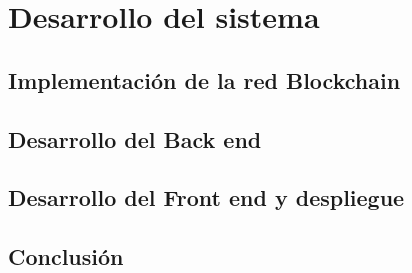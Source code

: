 \section{Desarrollo del sistema}

\subsection{Implementación de la red Blockchain}

\subsection{Desarrollo del Back end}

\subsection{Desarrollo del Front end y despliegue}

\subsection{Conclusión}

\newpage